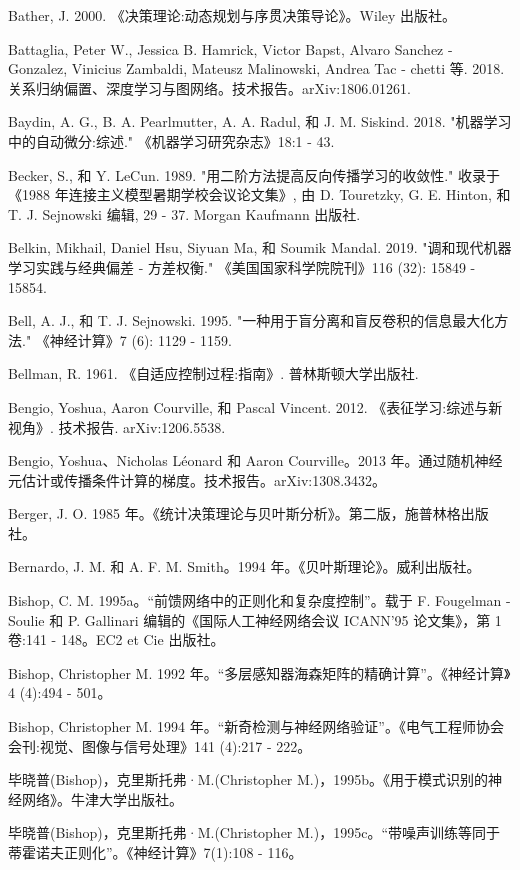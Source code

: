 \documentclass[10pt]{report}
\begin{document}
Bather, J. 2000. 《决策理论:动态规划与序贯决策导论》。Wiley 出版社。

Battaglia, Peter W., Jessica B. Hamrick, Victor Bapst, Alvaro Sanchez - Gonzalez, Vinicius Zambaldi, Mateusz Malinowski, Andrea Tac - chetti 等. 2018. 关系归纳偏置、深度学习与图网络。技术报告。arXiv:1806.01261.

Baydin, A. G., B. A. Pearlmutter, A. A. Radul, 和 J. M. Siskind. 2018. "机器学习中的自动微分:综述." 《机器学习研究杂志》18:1 - 43.

Becker, S., 和 Y. LeCun. 1989. "用二阶方法提高反向传播学习的收敛性." 收录于《1988 年连接主义模型暑期学校会议论文集》, 由 D. Touretzky, G. E. Hinton, 和 T. J. Sejnowski 编辑, 29 - 37. Morgan Kaufmann 出版社.

Belkin, Mikhail, Daniel Hsu, Siyuan Ma, 和 Soumik Mandal. 2019. "调和现代机器学习实践与经典偏差 - 方差权衡." 《美国国家科学院院刊》116 (32): 15849 - 15854.

Bell, A. J., 和 T. J. Sejnowski. 1995. "一种用于盲分离和盲反卷积的信息最大化方法." 《神经计算》7 (6): 1129 - 1159.

Bellman, R. 1961. 《自适应控制过程:指南》. 普林斯顿大学出版社.

Bengio, Yoshua, Aaron Courville, 和 Pascal Vincent. 2012. 《表征学习:综述与新视角》. 技术报告. arXiv:1206.5538.

Bengio, Yoshua、Nicholas Léonard 和 Aaron Courville。2013 年。通过随机神经元估计或传播条件计算的梯度。技术报告。arXiv:1308.3432。

Berger, J. O. 1985 年。《统计决策理论与贝叶斯分析》。第二版，施普林格出版社。

Bernardo, J. M. 和 A. F. M. Smith。1994 年。《贝叶斯理论》。威利出版社。

Bishop, C. M. 1995a。“前馈网络中的正则化和复杂度控制”。载于 F. Fougelman - Soulie 和 P. Gallinari 编辑的《国际人工神经网络会议 ICANN'95 论文集》，第 1 卷:141 - 148。EC2 et Cie 出版社。

Bishop, Christopher M. 1992 年。“多层感知器海森矩阵的精确计算”。《神经计算》4 (4):494 - 501。

Bishop, Christopher M. 1994 年。“新奇检测与神经网络验证”。《电气工程师协会会刊:视觉、图像与信号处理》141 (4):217 - 222。

毕晓普(Bishop)，克里斯托弗·M.(Christopher M.)，1995b。《用于模式识别的神经网络》。牛津大学出版社。

毕晓普(Bishop)，克里斯托弗·M.(Christopher M.)，1995c。“带噪声训练等同于蒂霍诺夫正则化”。《神经计算》7(1):108 - 116。
\end{document}
